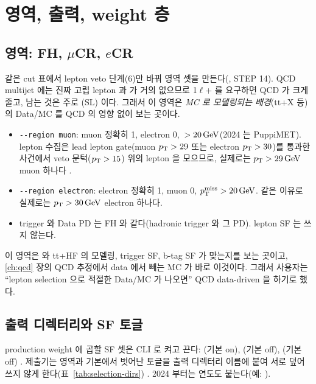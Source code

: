\section{영역, 출력, weight 층}\label{sec:selection-regions}

\subsection{영역: FH, $\mu$CR, $e$CR}
같은 cut 표에서 lepton veto 단계(6)만 바꿔 영역 셋을 만든다(, STEP 14). QCD multijet 에는 진짜 고립 lepton 과 \MET{} 가 거의 없으므로
1$\ell$+\MET{} 를 요구하면 QCD 가 크게 줄고, 남는 것은 주로 \ttbar{}(SL) 이다. 그래서 이 영역은 \emph{MC 로 모델링되는 배경}(tt+X 등)의 Data/MC 를
QCD 의 영향 없이 보는 곳이다.
\begin{itemize}
\item \texttt{-{}-region muon}: muon 정확히 1, electron 0, \,$>20\,\mathrm{GeV}$(2024 는 PuppiMET). lepton 수집은 lead lepton gate(muon $p_{\mathrm{T}}>29$ 또는
      electron $p_{\mathrm{T}}>30$)를 통과한 사건에서 veto 문턱($p_{\mathrm{T}}>15$) 위의 lepton 을 모으므로, 실제로는 $p_{\mathrm{T}}>29\,\mathrm{GeV}$ muon 하나다
      .
\item \texttt{-{}-region electron}: electron 정확히 1, muon 0, $p_{\mathrm{T}}^{\mathrm{miss}}>20\,\mathrm{GeV}$. 같은 이유로 실제로는 $p_{\mathrm{T}}>30\,\mathrm{GeV}$ electron 하나다.
\item trigger 와 Data PD 는 FH 와 같다(hadronic trigger 와 그 PD). lepton SF 는 쓰지 않는다.
\end{itemize}
이 영역은 \ttbar{} 와 tt+HF 의 모델링, trigger SF, b-tag SF 가 맞는지를 보는 곳이고, \ref{ch:qcd} 장의 QCD 추정에서 data 에서 빼는 MC 가 바로 이것이다.
그래서 사용자는 ``lepton selection 으로 적절한 Data/MC 가 나오면'' QCD data-driven 을 하기로 했다.

\subsection{출력 디렉터리와 SF 토글}
production weight  에 곱할 SF 셋은 CLI 로 켜고 끈다: (기본 on), (기본 off), (기본 off)
. 제출기는 영역과 기본에서 벗어난 토글을 출력 디렉터리 이름에 붙여 서로 덮어쓰지 않게 한다(표~\ref{tab:selection-dirs})
. 2024 부터는 연도도 붙는다(예: ).

